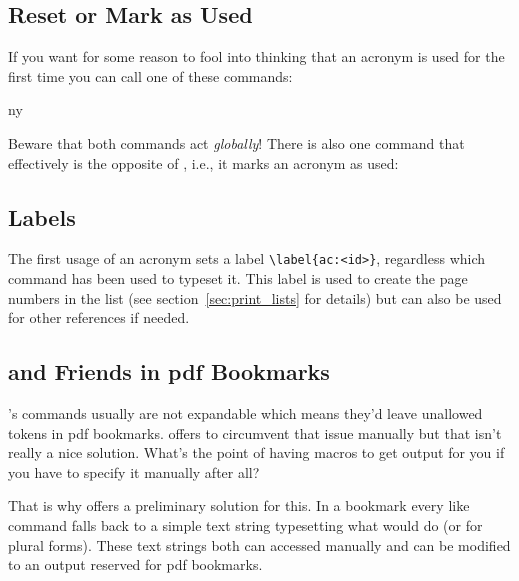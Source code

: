 \documentclass[DIV10,toc=index,toc=bib,hyperfootnotes=false]{cnpkgdoc}
\makeatletter
\newcommand*\sinceversion[1]{%
  \@bsphack
  \marginnote{%
    \footnotesize\sffamily\RaggedRight
    \textcolor{black!75}{Introduced in version~#1}}%
  \@esphack}
\makeatother
\begin{document}
\subsection{Reset or Mark as Used}
If you want for some reason to fool \acro into thinking that an acronym is used
for the first time you can call one of these commands:
\begin{beschreibung}
 \sinceversion{0.5}
\end{beschreibung}
\begin{beispiel}
 \ac{ny}
\end{beispiel}
Beware that both commands act \emph{globally}! There is also one command that
effectively is the opposite of , i.e., it marks an acronym as used:
\begin{beschreibung}
 \sinceversion{0.5}
 \sinceversion{0.6a}
\end{beschreibung}

\subsection{Labels}
The first usage of an acronym sets a label \verb+\label{ac:<id>}+, regardless
which command has been used to typeset it. This label is used to create the page
numbers in the list (see section~\ref{sec:print_lists} for details) but can also
be used for other references if needed.

\subsection{ and Friends in \acs*{pdf} Bookmarks}
\noindent\sinceversion{0.5}\acro's commands usually are not expandable which
means they'd leave unallowed tokens in \acs{pdf} bookmarks. 
offers  to circumvent that issue manually but that isn't
really a nice solution. What's the point of having macros to get output for you
if you have to specify it manually after all?

That is why \acro offers a preliminary solution for this. In a bookmark every
 like command falls back to a simple text string typesetting what 
would do (or  for plural forms). These text strings both can accessed
manually and can be modified to an output reserved for \acs{pdf} bookmarks.
\end{document}

